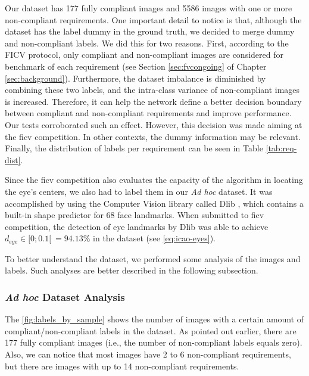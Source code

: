 Our dataset has 177 fully compliant images and 5586 images with one or more non-compliant requirements. One important detail to notice is that, although the \adhoc dataset has the label dummy in the ground truth, we decided to merge dummy and non-compliant labels. We did this for two reasons. First, according to the FICV protocol, only compliant and non-compliant images are considered for benchmark of each requirement (see Section \ref{sec:fvcongoing} of Chapter \ref{sec:background}). Furthermore, the dataset imbalance is diminished by combining these two labels, and the intra-class variance of non-compliant images is increased. Therefore, it can help the network define a better decision boundary between compliant and non-compliant requirements and improve performance. Our tests corroborated such an effect. However, this decision was made aiming at the \acs{ficv} competition. In other contexts, the dummy information may be relevant. Finally, the distribution of labels per requirement can be seen in Table \ref{tab:req-dist}. 



Since the \acs{ficv} competition also evaluates the capacity of the algorithm in locating the eye's centers, we also had to label them in our \textit{Ad hoc} dataset. It was accomplished by using the Computer Vision library called Dlib \citep{dlib}, which contains a built-in shape predictor for 68 face landmarks. When submitted to \acs{ficv} competition, the detection of eye landmarks by Dlib was able to achieve $d_{eye} \in [0;0.1[\ = 94.13\%$ in the \ficvtest dataset (see \autoref{eq:icao-eyes}).

To better understand the \adhoc dataset, we performed some analysis of the images and labels. Such analyses are better described in the following subsection.

\subsubsection{\textit{Ad hoc} Dataset Analysis}

The \autoref{fig:labels_by_sample} shows the number of images with a certain amount of compliant/non-compliant labels in the \adhoc dataset. As pointed out earlier, there are 177 fully compliant images (i.e., the number of non-compliant labels equals zero). Also, we can notice that most images have 2 to 6 non-compliant requirements, but there are images with up to 14 non-compliant requirements.

